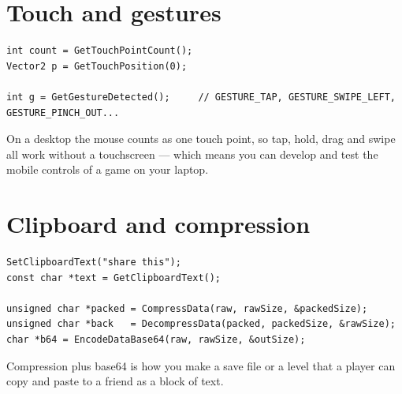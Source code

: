 
\section{Touch and gestures}

\begin{lstlisting}
int count = GetTouchPointCount();
Vector2 p = GetTouchPosition(0);

int g = GetGestureDetected();     // GESTURE_TAP, GESTURE_SWIPE_LEFT, GESTURE_PINCH_OUT...
\end{lstlisting}

On a desktop the mouse counts as one touch point, so tap, hold, drag and swipe
all work without a touchscreen --- which means you can develop and test the mobile
controls of a game on your laptop.

\section{Clipboard and compression}

\begin{lstlisting}
SetClipboardText("share this");
const char *text = GetClipboardText();

unsigned char *packed = CompressData(raw, rawSize, &packedSize);
unsigned char *back   = DecompressData(packed, packedSize, &rawSize);
char *b64 = EncodeDataBase64(raw, rawSize, &outSize);
\end{lstlisting}

Compression plus base64 is how you make a save file or a level that a player can
copy and paste to a friend as a block of text.


